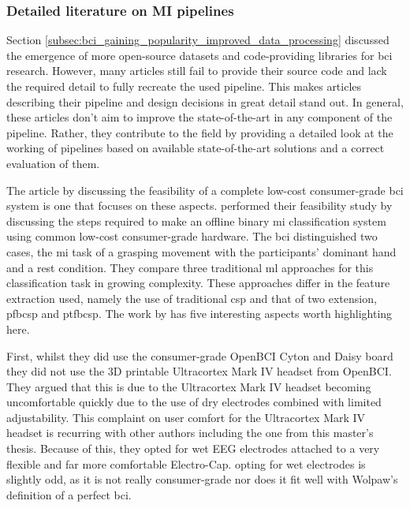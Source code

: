 
\subsubsection{Detailed literature on MI pipelines}
\label{subsubsec:bci_opportunities_obstacles_motivating_examples_mi_pipeline}

Section \ref{subsec:bci_gaining_popularity_improved_data_processing} discussed the emergence of more open-source datasets and code-providing libraries for \gls{bci} research.
However, many articles still fail to provide their source code and lack the required detail to fully recreate the used pipeline.
This makes articles describing their pipeline and design decisions in great detail stand out.
In general, these articles don't aim to improve the state-of-the-art in any component of the pipeline.
Rather, they contribute to the field by providing a detailed look at the working of pipelines based on available state-of-the-art solutions and a correct evaluation of them.

The article by \citet{cheap_bci_feasibility} discussing the feasibility of a complete low-cost consumer-grade \gls{bci} system is one that focuses on these aspects.
 performed their feasibility study by discussing the steps required to make an offline binary \gls{mi} classification system using common low-cost consumer-grade hardware.
The \gls{bci} distinguished two cases, the \gls{mi} task of a grasping movement with the participants' dominant hand and a rest condition.
They compare three traditional \gls{ml} approaches for this classification task in growing complexity.
These approaches differ in the feature extraction used, namely the use of traditional \gls{csp} and that of two extension, \gls{pfbcsp} and \gls{ptfbcsp}.
The work by \citet{cheap_bci_feasibility} has five interesting aspects worth highlighting here.

First, whilst they did use the consumer-grade OpenBCI Cyton and Daisy board they did not use the 3D printable Ultracortex Mark IV headset from OpenBCI.
They argued that this is due to the Ultracortex Mark IV headset becoming uncomfortable quickly due to the use of dry electrodes combined with limited adjustability.
This complaint on user comfort for the Ultracortex Mark IV headset is recurring with other authors including the one from this master's thesis.
Because of this, they opted for wet EEG electrodes attached to a very flexible and far more comfortable Electro-Cap.
 opting for wet electrodes is slightly odd, as it is not really consumer-grade nor does it fit well with Wolpaw's definition of a perfect \gls{bci}.

